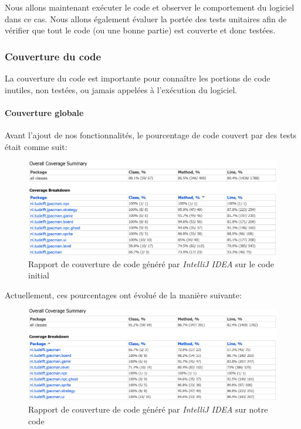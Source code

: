 \documentclass[12pt, openany]{report}
\begin{document}
Nous allons maintenant exécuter le code et observer le comportement du logiciel dans ce cas. Nous allons également évaluer la portée des tests unitaires afin de vérifier que tout le code (ou une bonne partie) est couverte et donc testées.

\subsubsection{Couverture du code}

La couverture du code est importante pour connaître les portions de code inutiles, non testées, ou jamais appelées à l'exécution du logiciel.

\paragraph{Couverture globale}

Avant l'ajout de nos fonctionnalités, le pourcentage de code couvert par des tests était comme suit: 

\begin{figure}[!h]
	\centering
	\includegraphics[width=\textwidth]{Images/InitialCoverage}
	\caption{\label{InitialCoverage} Rapport de couverture de code généré par \textit{IntelliJ IDEA} sur le code initial}
\end{figure}


Actuellement, ces pourcentages ont évolué de la manière suivante:

\begin{figure}[!h]
	\centering
	\includegraphics[width=\textwidth]{Images/MergedCoverage}
	\caption{\label{MergedCoverage} Rapport de couverture de code généré par \textit{IntelliJ IDEA} sur notre code}
\end{figure}
\end{document}

